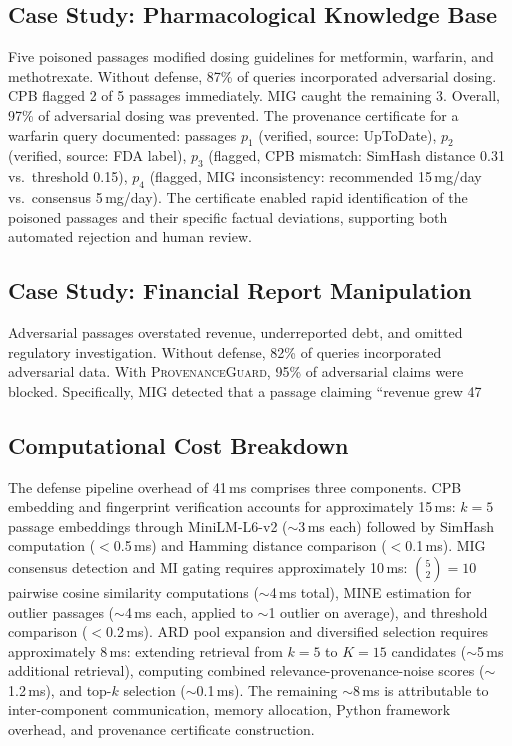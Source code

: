 \documentclass[journal,10pt]{IEEEtran}
\begin{document}
\subsection{Case Study: Pharmacological Knowledge Base}
Five poisoned passages modified dosing guidelines for metformin, warfarin, and methotrexate. Without defense, 87\% of queries incorporated adversarial dosing. CPB flagged 2 of 5 passages immediately. MIG caught the remaining 3. Overall, 97\% of adversarial dosing was prevented. The provenance certificate for a warfarin query documented: passages $p_1$ (verified, source: UpToDate), $p_2$ (verified, source: FDA label), $p_3$ (flagged, CPB mismatch: SimHash distance 0.31 vs.\ threshold 0.15), $p_4$ (flagged, MIG inconsistency: recommended 15\,mg/day vs.\ consensus 5\,mg/day). The certificate enabled rapid identification of the poisoned passages and their specific factual deviations, supporting both automated rejection and human review.

\subsection{Case Study: Financial Report Manipulation}
Adversarial passages overstated revenue, underreported debt, and omitted regulatory investigation. Without defense, 82\% of queries incorporated adversarial data. With \textsc{ProvenanceGuard}, 95\% of adversarial claims were blocked. Specifically, MIG detected that a passage claiming ``revenue grew 47\\%

\subsection{Computational Cost Breakdown}

The defense pipeline overhead of 41\,ms comprises three components. CPB embedding and fingerprint verification accounts for approximately 15\,ms: $k=5$ passage embeddings through MiniLM-L6-v2 ($\sim$3\,ms each) followed by SimHash computation ($<$0.5\,ms) and Hamming distance comparison ($<$0.1\,ms). MIG consensus detection and MI gating requires approximately 10\,ms: $\binom{5}{2}=10$ pairwise cosine similarity computations ($\sim$4\,ms total), MINE estimation for outlier passages ($\sim$4\,ms each, applied to $\sim$1 outlier on average), and threshold comparison ($<$0.2\,ms). ARD pool expansion and diversified selection requires approximately 8\,ms: extending retrieval from $k=5$ to $K=15$ candidates ($\sim$5\,ms additional retrieval), computing combined relevance-provenance-noise scores ($\sim$1.2\,ms), and top-$k$ selection ($\sim$0.1\,ms). The remaining $\sim$8\,ms is attributable to inter-component communication, memory allocation, Python framework overhead, and provenance certificate construction.
\end{document}
